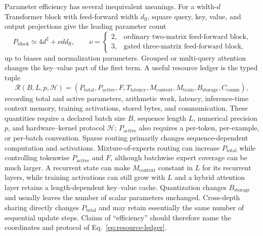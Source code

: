 \documentclass[10pt]{article}
\theoremstyle{definition}
\theoremstyle{remark}
\begin{document}
Parameter efficiency has several inequivalent meanings.  For a width-$d$ Transformer block with
feed-forward width $d_{\mathrm{ff}}$, square query, key, value, and output projections give the
leading parameter count
\begin{equation}
P_{\mathrm{block}}
\simeq 4d^2+\nu d d_{\mathrm{ff}},
\qquad
\nu=
\begin{cases}
2,&\text{ordinary two-matrix feed-forward block},\\
3,&\text{gated three-matrix feed-forward block},
\end{cases}
\label{eq:transformer-block-parameters}
\end{equation}
up to biases and normalization parameters.  Grouped or multi-query attention changes the
key--value part of the first term.  A useful resource ledger is the typed tuple
\begin{equation}
\mathscr R(B,L,p,\mathcal H)
=
\left(
P_{\mathrm{total}},P_{\mathrm{active}},F,T_{\mathrm{latency}},
M_{\mathrm{context}},M_{\mathrm{train}},B_{\mathrm{storage}},C_{\mathrm{comm}}
\right),
\label{eq:resource-ledger}
\end{equation}
recording total and active parameters, arithmetic work, latency, inference-time context memory,
training activations, stored bytes, and communication.  These quantities require a declared batch
size $B$, sequence length $L$, numerical precision $p$, and hardware--kernel protocol $\mathcal H$;
$P_{\mathrm{active}}$ also requires a per-token, per-example, or per-batch convention.  Sparse
routing primarily changes sequence-dependent computation and activations.  Mixture-of-experts
routing can increase $P_{\mathrm{total}}$ while controlling tokenwise $P_{\mathrm{active}}$ and
$F$, although batchwise expert coverage can be much larger.  A recurrent state can make
$M_{\mathrm{context}}$ constant in $L$ for its recurrent layers, while training activations can
still grow with $L$ and a hybrid attention layer retains a length-dependent key--value cache.
Quantization changes $B_{\mathrm{storage}}$ and usually leaves the number of scalar parameters
unchanged.  Cross-depth sharing directly changes $P_{\mathrm{total}}$ and may retain essentially
the same number of sequential update steps.  Claims of ``efficiency'' should therefore name the
coordinates and protocol of Eq.~\ref{eq:resource-ledger}.
\end{document}
